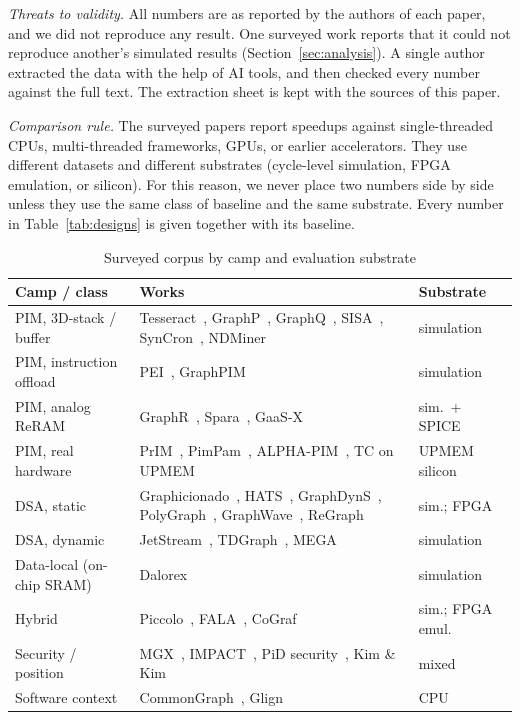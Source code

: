 \documentclass[journal,onecolumn]{IEEEtran}
\begin{document}
\emph{Threats to validity.} All numbers are as reported by the authors of each paper, and we did not reproduce any result. One surveyed work reports that it could not reproduce another's simulated results (Section~\ref{sec:analysis}). A single author extracted the data with the help of AI tools, and then checked every number against the full text. The extraction sheet is kept with the sources of this paper.

\emph{Comparison rule.} The surveyed papers report speedups against single-threaded CPUs, multi-threaded frameworks, GPUs, or earlier accelerators. They use different datasets and different substrates (cycle-level simulation, FPGA emulation, or silicon). For this reason, we never place two numbers side by side unless they use the same class of baseline and the same substrate. Every number in Table~\ref{tab:designs} is given together with its baseline.

\begin{table}[t]
\caption{Surveyed corpus by camp and evaluation substrate}
\label{tab:corpus}
\centering\footnotesize
\begin{tabularx}{\columnwidth}{@{}L{3.3cm}YL{2.4cm}@{}}
\toprule
Camp / class & Works & Substrate \\
\midrule
PIM, 3D-stack / buffer & Tesseract~\cite{ahn2015tesseract}, GraphP~\cite{zhang2018graphp}, GraphQ~\cite{zhuo2019graphq}, SISA~\cite{besta2021sisa}, SynCron~\cite{giannoula2021syncron}, NDMiner~\cite{talati2022ndminer} & simulation \\
PIM, instruction offload & PEI~\cite{ahn2015pei}, GraphPIM~\cite{nai2017graphpim} & simulation \\
PIM, analog ReRAM & GraphR~\cite{song2018graphr}, Spara~\cite{zheng2020spara}, GaaS-X~\cite{challapalle2020gaasx} & sim.\ + SPICE \\
PIM, real hardware & PrIM~\cite{gomezluna2022prim}, PimPam~\cite{cai2024pimpam}, ALPHA-PIM~\cite{barkhordar2025alphapim}, TC on UPMEM~\cite{asquini2025tc} & UPMEM silicon \\
DSA, static & Graphicionado~\cite{ham2016graphicionado}, HATS~\cite{mukkara2018hats}, GraphDynS~\cite{yan2019graphdyns}, PolyGraph~\cite{dadu2021polygraph}, GraphWave~\cite{lee2022graphwave}, ReGraph~\cite{chen2022regraph} & sim.; FPGA \\
DSA, dynamic & JetStream~\cite{rahman2021jetstream}, TDGraph~\cite{zhao2022tdgraph}, MEGA~\cite{gao2023mega} & simulation \\
Data-local (on-chip SRAM) & Dalorex~\cite{orenesvera2023dalorex} & simulation \\
Hybrid & Piccolo~\cite{shin2025piccolo}, FALA~\cite{shin2025fala}, CoGraf~\cite{yenimol2026cograf} & sim.; FPGA emul. \\
Security / position & MGX~\cite{hua2022mgx}, IMPACT~\cite{bostanci2025impact}, PiD security~\cite{yuksel2026pid}, Kim \& Kim~\cite{kim2020dynamic} & mixed \\
Software context & CommonGraph~\cite{afarin2023commongraph}, Glign~\cite{yin2023glign} & CPU \\
\bottomrule
\end{tabularx}
\end{table}
\end{document}
